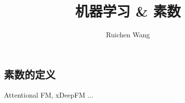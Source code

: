 \documentclass{article}
\author{Ruichen Wang}
\title{机器学习 \& 素数}
\begin{document}
\begin{CJK*}{UTF8}{gbsn}

\maketitle

\section{素数的定义}

Attentional FM, xDeepFM ...


\end{CJK*}
\end{document}
